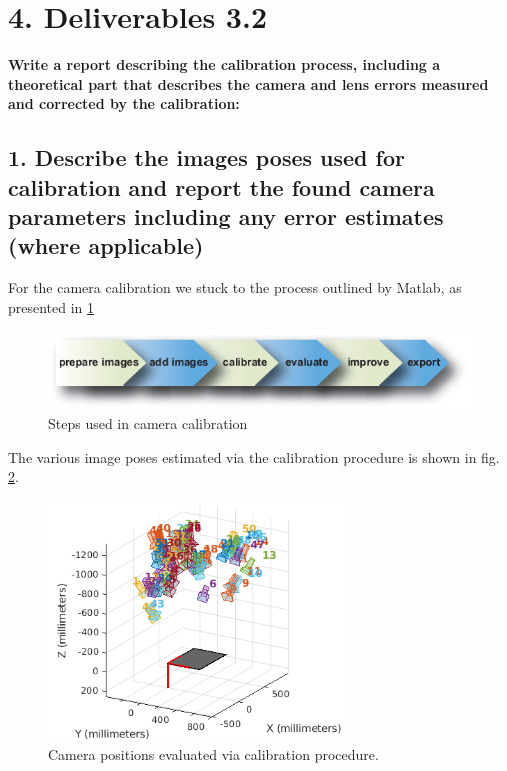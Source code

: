 \section*{4. Deliverables 3.2}
\textbf{Write a report describing the calibration process, including a theoretical part that describes the camera and lens errors measured and corrected by the calibration:}
\subsection*{1. Describe the images poses used for calibration and report the found camera parameters including any error estimates (where applicable)}
For the camera calibration we stuck to the process outlined by Matlab, as presented in \ref{fig:cameracalibratorappsteps}

\begin{figure}[ht!]
	\centering
	\includegraphics[width=0.7\linewidth]{graphics/cameracalibrator_app_steps}
	\caption{Steps used in camera calibration}
	\label{fig:cameracalibratorappsteps}
\end{figure}

The various image poses estimated via the calibration procedure is shown in fig. \ref{fig:poses}.
\begin{figure}[H]
\begin{center}
\includegraphics[width=0.7\textwidth]{graphics/camera_positions.png}
\caption{Camera positions evaluated via calibration procedure.}
\label{fig:poses}
\end{center}
\end{figure}

